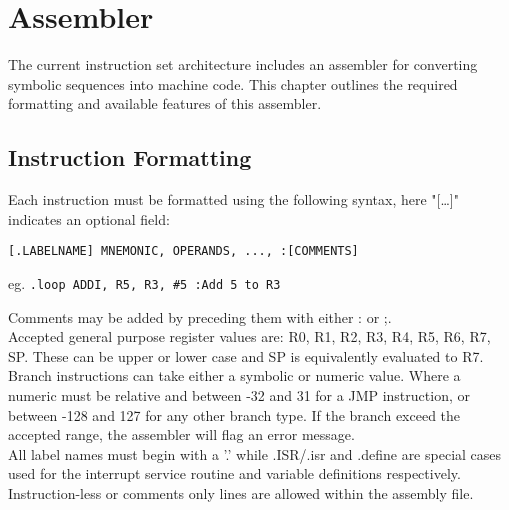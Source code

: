 
\section{Assembler}
The current instruction set architecture includes an assembler for converting symbolic sequences into machine code. This chapter outlines the required formatting and available features of this assembler. 

\subsection{Instruction Formatting}
Each instruction must be formatted using the following syntax, here "[\dots]" indicates an optional field:

\begin{center}\texttt{[.LABELNAME] MNEMONIC, OPERANDS, ..., :[COMMENTS]}\end{center}

\begin{center}eg. \texttt{.loop ADDI, R5, R3, \#5 :Add 5 to R3}
\end{center}

\noindent Comments may be added by preceding them with either : or ;.\\

\noindent Accepted general purpose register values are: R0, R1, R2, R3, R4, R5, R6, R7, SP. These can be upper or lower case and SP is equivalently evaluated to R7.\\

\noindent Branch instructions can take either a symbolic or numeric value. 
Where a numeric must be relative and between -32 and 31 for a JMP instruction, or between -128 and 127 for any other branch type. 
If the branch exceed the accepted range, the assembler will flag an error message. \\

\noindent All label names must begin with a '.' while .ISR/.isr and .define are special cases used for the interrupt service routine and variable definitions respectively. \\

\noindent Instruction-less or comments only lines are allowed within the assembly file. \\
\newpage
{}

